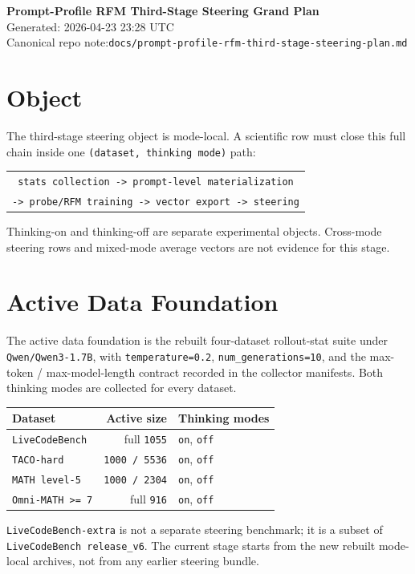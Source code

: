 \documentclass[11pt]{article}
\begin{document}
{\Large \textbf{Prompt-Profile RFM Third-Stage Steering Grand Plan}}\\
Generated: 2026-04-23 23:28 UTC\\
Canonical repo note:\quad \texttt{docs/prompt-profile-rfm-third-stage-steering-plan.md}

\section*{Object}
The third-stage steering object is mode-local. A scientific row must close this
full chain inside one \texttt{(dataset, thinking mode)} path:
\begin{center}
\begin{tabular}{c}
\texttt{stats collection -> prompt-level materialization}\\
\texttt{-> probe/RFM training -> vector export -> steering}
\end{tabular}
\end{center}
Thinking-on and thinking-off
are separate experimental objects. Cross-mode steering rows and mixed-mode
average vectors are not evidence for this stage.

\section*{Active Data Foundation}
The active data foundation is the rebuilt four-dataset rollout-stat suite under
\texttt{Qwen/Qwen3-1.7B}, with \texttt{temperature=0.2},
\texttt{num\_generations=10}, and the max-token / max-model-length contract
recorded in the collector manifests. Both thinking modes are collected for every
dataset.

\begin{center}
\begin{tabular}{lrl}
\toprule
Dataset & Active size & Thinking modes \\
\midrule
\texttt{LiveCodeBench} & full \texttt{1055} & \texttt{on}, \texttt{off} \\
\texttt{TACO-hard} & \texttt{1000 / 5536} & \texttt{on}, \texttt{off} \\
\texttt{MATH level-5} & \texttt{1000 / 2304} & \texttt{on}, \texttt{off} \\
\texttt{Omni-MATH >= 7} & full \texttt{916} & \texttt{on}, \texttt{off} \\
\bottomrule
\end{tabular}
\end{center}

\texttt{LiveCodeBench-extra} is not a separate steering benchmark; it is a
subset of \texttt{LiveCodeBench release\_v6}. The current stage starts from the
new rebuilt mode-local archives, not from any earlier steering bundle.
\end{document}

